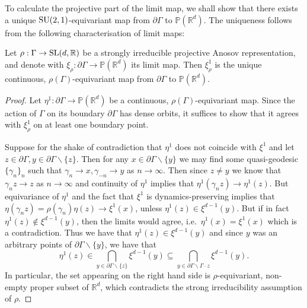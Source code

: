 \documentclass{report}
\begin{document}
To calculate the projective part of the limit map, we shall show that there exists a unique $\operatorname{{\mathrm{SU}}}(2,1)$-equivariant map from $\partial \Gamma$ to $\mathbb P (\mathbb R^d)$.
The uniqueness follows from the following characterisation of limit maps: 
\begin{lemma}\label{lem:equivariance_uniqueness}
    Let $\rho: \Gamma \to \operatorname{{\mathrm{SL}}}(d, \mathbb R) $ be a strongly irreducible projective Anosov representation, and denote with $\xi_\rho: \partial \Gamma \to \mathbb P(\mathbb R^d)$ its limit map.
    Then $\xi^1_\rho$ is the unique continuous, $\rho(\Gamma)$-equivariant map from $\partial \Gamma$ to $\mathbb P(\mathbb R^d)$.
\end{lemma}
\begin{proof}
    Let $\eta^1: \partial \Gamma \to \mathbb P(\mathbb R^d)$ be a continuous, $\rho(\Gamma)$-equivariant map.
    Since the action of $\Gamma$ on its boundary $\partial \Gamma$ has dense orbits, it suffices to show that it agrees with $\xi^1_\rho$ on at least one boundary point.

    Suppose for the shake of contradiction that $\eta^1$ does not coincide with $ \xi^1$ and let $z \in \partial \Gamma, y \in \partial \Gamma \backslash \{z\}$.
    Then for any $x \in \partial \Gamma \backslash \{y \}$ we may find some quasi-geodesic $\{\gamma_n\}_n$ such that $\gamma_n \to x, \gamma_{-n} \to y$ as $n \to \infty$.
    Then since $z \neq y$ we know that $\gamma_n z \to z$ as $n \to \infty$ and continuity of $\eta^1$ implies that $\eta^1(\gamma_n z) \to \eta^1(z)$.
    But equivariance of $\eta^1$ and the fact that $\xi^1$ is dynamics-preserving implies that $\eta(\gamma_n z) = \rho(\gamma_n) \eta(z) \to \xi^1(x)$,
    unless $\eta^1(z) \in \xi^{d-1}(y)$.
    But if in fact $\eta^1(z) \not \in \xi^{d-1}(y)$, then the limits would agree, i.e.\ $\eta^1(x) = \xi^1(x)$ which is a contradiction.
    Thus we have that $\eta^1(z) \in \xi^{d-1}(y)$ and since $y$ was an arbitrary points of $\partial \Gamma \backslash \{y\}$, we have that
    \[
    \eta^1(z) \in \bigcap_{y \in \partial \Gamma \backslash \{z\}} \xi^{d-1}(y) \subseteq 
    \bigcap_{y \in \partial \Gamma \backslash \Gamma \cdot z} \xi^{d-1}(y).
    \] 
    In particular, the set appearing on the right hand side is $\rho$-equivariant, non-empty proper subset of $\mathbb R^d$, which contradicts the strong irreducibility assumption of $\rho$.
\end{proof}
\end{document}
